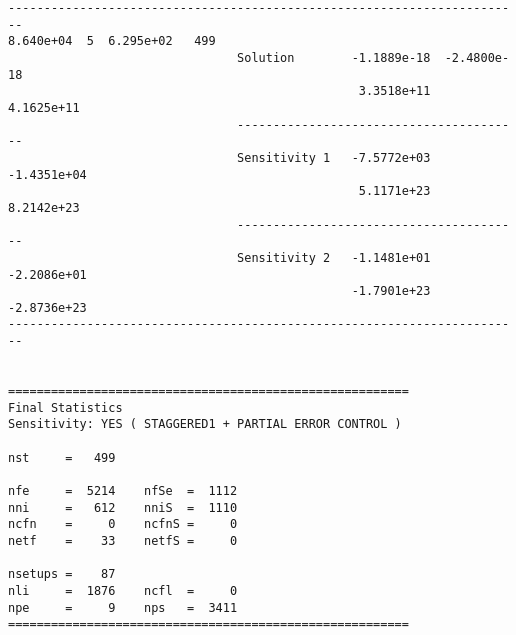 \begin{verbatim}
------------------------------------------------------------------------
8.640e+04  5  6.295e+02   499
                                Solution        -1.1889e-18  -2.4800e-18 
                                                 3.3518e+11   4.1625e+11 
                                ----------------------------------------
                                Sensitivity 1   -7.5772e+03  -1.4351e+04 
                                                 5.1171e+23   8.2142e+23 
                                ----------------------------------------
                                Sensitivity 2   -1.1481e+01  -2.2086e+01 
                                                -1.7901e+23  -2.8736e+23 
------------------------------------------------------------------------


========================================================
Final Statistics
Sensitivity: YES ( STAGGERED1 + PARTIAL ERROR CONTROL )

nst     =   499                

nfe     =  5214    nfSe  =  1112  
nni     =   612    nniS  =  1110  
ncfn    =     0    ncfnS =     0  
netf    =    33    netfS =     0

nsetups =    87                  
nli     =  1876    ncfl  =     0  
npe     =     9    nps   =  3411  
========================================================
\end{verbatim}